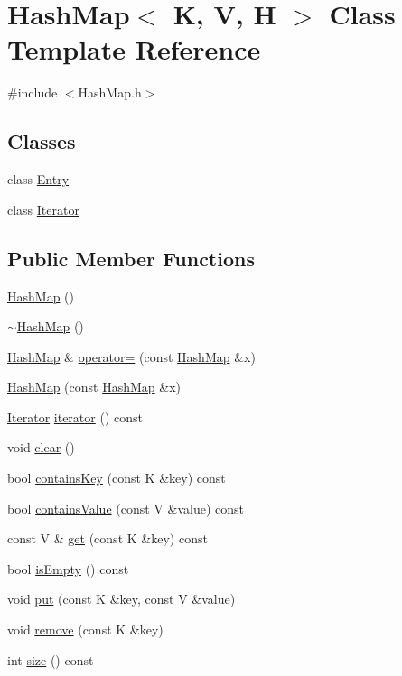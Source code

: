 \hypertarget{class_hash_map}{\section{Hash\-Map$<$ K, V, H $>$ Class Template Reference}
\label{class_hash_map}
}


{\ttfamily \#include $<$Hash\-Map.\-h$>$}

\subsection*{Classes}
\begin{DoxyCompactItemize}
\item 
class \hyperlink{class_hash_map_1_1_entry}{Entry}
\item 
class \hyperlink{class_hash_map_1_1_iterator}{Iterator}
\end{DoxyCompactItemize}
\subsection*{Public Member Functions}
\begin{DoxyCompactItemize}
\item 
\hyperlink{class_hash_map_aa93ddf9596512c3e842fe59ca15e9e13}{Hash\-Map} ()
\item 
\hyperlink{class_hash_map_a3d7c06dec87b3d40af6910cb401f8dcb}{$\sim$\-Hash\-Map} ()
\item 
\hyperlink{class_hash_map}{Hash\-Map} \& \hyperlink{class_hash_map_ab6c4c9d3ca5b69d7c19bb10ec6f6b527}{operator=} (const \hyperlink{class_hash_map}{Hash\-Map} \&x)
\item 
\hyperlink{class_hash_map_a3067fc2e4f1e3dca0666a74cfe574aba}{Hash\-Map} (const \hyperlink{class_hash_map}{Hash\-Map} \&x)
\item 
\hyperlink{class_hash_map_1_1_iterator}{Iterator} \hyperlink{class_hash_map_aa7304aa546429a9d6efdf98212f7bed2}{iterator} () const 
\item 
void \hyperlink{class_hash_map_a126d97ebd7a4a0c5d88a6e1cc8e1a8eb}{clear} ()
\item 
bool \hyperlink{class_hash_map_a845b9f47bbde02094ae9f60fbd2cc380}{contains\-Key} (const K \&key) const 
\item 
bool \hyperlink{class_hash_map_a0b236f958ef6ac2706c8127c27024a99}{contains\-Value} (const V \&value) const 
\item 
const V \& \hyperlink{class_hash_map_aa0d97505a2c30b30913ede8d89429a92}{get} (const K \&key) const 
\item 
bool \hyperlink{class_hash_map_afc5be2f3abd968fc5a6b276e2d48215f}{is\-Empty} () const 
\item 
void \hyperlink{class_hash_map_adf7576adb99222e66acf5860d5f3402b}{put} (const K \&key, const V \&value)
\item 
void \hyperlink{class_hash_map_a5aef39019e82dcd7027a9efd42a0c8c9}{remove} (const K \&key)
\item 
int \hyperlink{class_hash_map_ab7977a0f47381547893744d66c213897}{size} () const 
\end{DoxyCompactItemize}



